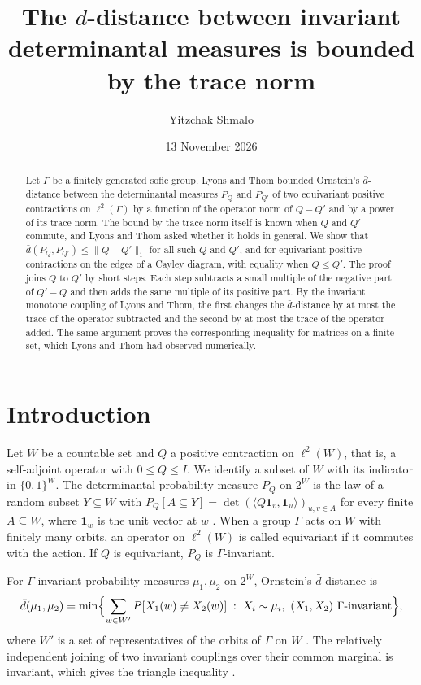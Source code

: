 \documentclass[11pt]{amsart}
\title[The $\bar d$-distance between determinantal measures]{The $\bar d$-distance between invariant determinantal measures is bounded by the trace norm}
\author{Yitzchak Shmalo}
\date{13 November 2026}
\theoremstyle{remark}
\numberwithin{equation}{section}
\newcommand{\dbar}{\bar d}
\begin{document}
\begin{abstract}
Let $\Gamma$ be a finitely generated sofic group. Lyons and Thom bounded Ornstein's $\bar d$-distance between the determinantal measures $P_Q$ and $P_{Q'}$ of two equivariant positive contractions on $\ell^2(\Gamma)$ by a function of the operator norm of $Q-Q'$ and by a power of its trace norm. The bound by the trace norm itself is known when $Q$ and $Q'$ commute, and Lyons and Thom asked whether it holds in general. We show that $\bar d(P_Q,P_{Q'})\le\|Q-Q'\|_1$ for all such $Q$ and $Q'$, and for equivariant positive contractions on the edges of a Cayley diagram, with equality when $Q\le Q'$. The proof joins $Q$ to $Q'$ by short steps. Each step subtracts a small multiple of the negative part of $Q'-Q$ and then adds the same multiple of its positive part. By the invariant monotone coupling of Lyons and Thom, the first changes the $\bar d$-distance by at most the trace of the operator subtracted and the second by at most the trace of the operator added. The same argument proves the corresponding inequality for matrices on a finite set, which Lyons and Thom had observed numerically.
\end{abstract}
\maketitle

\section{Introduction}\label{sec:intro}

Let $W$ be a countable set and $Q$ a positive contraction on $\ell^2(W)$, that is, a self-adjoint operator with $0\le Q\le I$. We identify a subset of $W$ with its indicator in $\{0,1\}^W$. The determinantal probability measure $P_Q$ on $2^W$ is the law of a random subset $Y\subseteq W$ with $P_Q[A\subseteq Y]=\det(\langle Q\mathbf 1_v,\mathbf 1_u\rangle)_{u,v\in A}$ for every finite $A\subseteq W$, where $\mathbf 1_w$ is the unit vector at $w$ \cite{Ly03}. When a group $\Gamma$ acts on $W$ with finitely many orbits, an operator on $\ell^2(W)$ is called equivariant if it commutes with the action. If $Q$ is equivariant, $P_Q$ is $\Gamma$-invariant.

For $\Gamma$-invariant probability measures $\mu_1,\mu_2$ on $2^W$, Ornstein's $\bar d$-distance \cite{Or74} is
\begin{equation}\label{eq:dbar}
\dbar(\mu_1,\mu_2)=\min\Bigl\{\sum_{w\in W'}P[X_1(w)\neq X_2(w)]\;:\;X_i\sim\mu_i,\ (X_1,X_2)\ \text{$\Gamma$-invariant}\Bigr\},
\end{equation}
where $W'$ is a set of representatives of the orbits of $\Gamma$ on $W$ \cite[Section~7]{LT16}. The relatively independent joining of two invariant couplings over their common marginal is invariant, which gives the triangle inequality \cite[Section~7]{LT16}.
\end{document}

